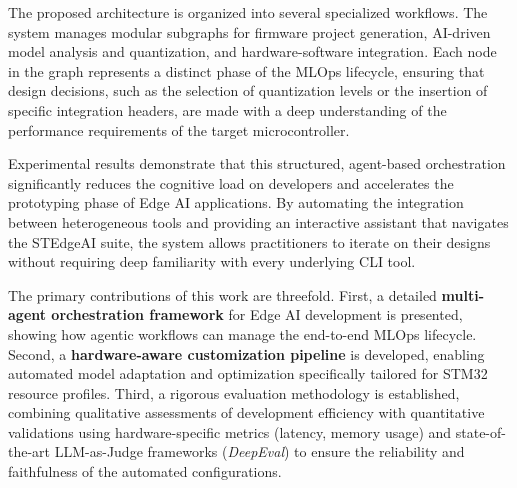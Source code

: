 The proposed architecture is organized into several specialized workflows. The system manages modular subgraphs for firmware project generation, AI-driven model analysis and quantization, and hardware-software integration. Each node in the graph represents a distinct phase of the MLOps lifecycle, ensuring that design decisions, such as the selection of quantization levels or the insertion of specific integration headers, are made with a deep understanding of the performance requirements of the target microcontroller.

Experimental results demonstrate that this structured, agent-based orchestration significantly reduces the cognitive load on developers and accelerates the prototyping phase of Edge AI applications. By automating the integration between heterogeneous tools and providing an interactive assistant that navigates the STEdgeAI suite, the system allows practitioners to iterate on their designs without requiring deep familiarity with every underlying CLI tool.

The primary contributions of this work are threefold. First, a detailed \textbf{multi-agent orchestration framework} for Edge AI development is presented, showing how agentic workflows can manage the end-to-end MLOps lifecycle. Second, a \textbf{hardware-aware customization pipeline} is developed, enabling automated model adaptation and optimization specifically tailored for STM32 resource profiles. Third, a rigorous evaluation methodology is established, combining qualitative assessments of development efficiency with quantitative validations using hardware-specific metrics (latency, memory usage) and state-of-the-art LLM-as-Judge frameworks (\textit{DeepEval}) to ensure the reliability and faithfulness of the automated configurations.

